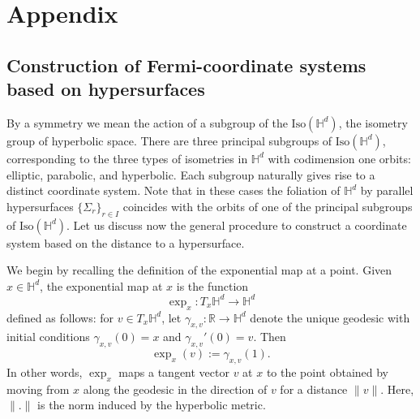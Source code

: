 \documentclass[12pt,longbibliography]{article}
\def\d{\,\mathrm{d}}
\def\d{\,\mathrm{d}}
\def\H{\mathbb{H}}
\theoremstyle{definition}
\theoremstyle{remark}
\theoremstyle{example}
\newcommand{\ag}[1]{{\color{magenta} #1}}
\begin{document}
%	
%	


\appendix

\section{Appendix}

\subsection{Construction of Fermi-coordinate systems based on hypersurfaces}\label{sect:construction_coordinates}

By a symmetry we mean the action of a subgroup of the \(\mathrm{Iso}(\mathbb{H}^d)\), the isometry group of hyperbolic space. There are three principal subgroups of \(\mathrm{Iso}(\mathbb{H}^d)\), corresponding to the three types of isometries in $\mathbb{H}^d$ with codimension one orbits: elliptic, parabolic, and hyperbolic. Each subgroup naturally gives rise to a distinct coordinate system. %
Note that in these cases the foliation of $\H^d$ by parallel hypersurfaces \(\{\Sigma_r\}_{r \in I}\) coincides with the orbits of one of the principal subgroups of \(\mathrm{Iso}(\mathbb{H}^d)\).  Let us discuss now the general procedure to construct a coordinate system based on the distance to a hypersurface.

We begin by recalling the definition of the exponential map at a point. Given \(x \in \mathbb{H}^d\), the exponential map at \(x\) is the function  
\[
\exp_x : T_x \mathbb{H}^d \longrightarrow \mathbb{H}^d
\]
defined as follows: for \(v \in T_x \mathbb{H}^d\), let \(\gamma_{x,v}: \mathbb{R} \to \mathbb{H}^d\) denote the unique geodesic with initial conditions \(\gamma_{x,v}(0) = x\) and \(\gamma_{x,v}'(0) = v\). Then  
\[
\exp_x(v) := \gamma_{x,v}(1).
\]
In other words, \(\exp_x\) maps a tangent vector \(v\) at \(x\) to the point obtained by moving from \(x\) along the geodesic in the direction of \(v\) for a distance \(\|v\|\). Here, $\| . \|$ is the norm induced by the hyperbolic metric.
\end{document}
